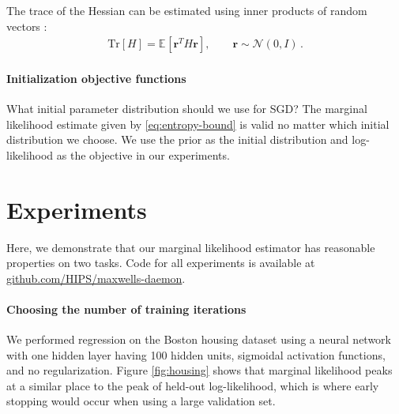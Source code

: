 \documentclass{article} %
\newcommand{\vr}{\mathbf{r}}
\newcommand{\expectargs}[2]{\mathbb{E}_{#1} \left[ {#2} \right]}
\newcommand{\N}[2]{\mathcal{N}\!\left(#1,#2\right)}
\newcommand{\trace}[1]{\text{Tr}\left[#1\right]}
\begin{document}
The trace of the Hessian can be estimated using inner products of random vectors
\citep{bai1996some}:
%
\begin{align}
\trace{H} = \expectargs{}{\vr^TH\vr}, \qquad \vr \sim \N{0}{I}\,.
\label{eq:approx-log-det}
\end{align}
%


\paragraph{Initialization objective functions}
\label{sec:priors}
What initial parameter distribution should we use for SGD?
The marginal likelihood estimate given by \eqref{eq:entropy-bound} is valid no matter which initial distribution we choose.
We use the prior as the initial distribution and log-likelihood as the objective in our experiments.


\section{Experiments}
\label{sec:experiments}

Here, we demonstrate that our marginal likelihood estimator has reasonable properties on two tasks.
Code for all experiments is available at \url{github.com/HIPS/maxwells-daemon}.

\paragraph{Choosing the number of training iterations}
We performed regression on the Boston housing dataset 
using a neural network with one hidden layer having 100 hidden units, sigmoidal activation functions, and no regularization.
Figure \ref{fig:housing} shows that marginal likelihood peaks at a similar place to the peak of held-out log-likelihood, which is where early stopping would occur when using a large validation set.
\end{document}
